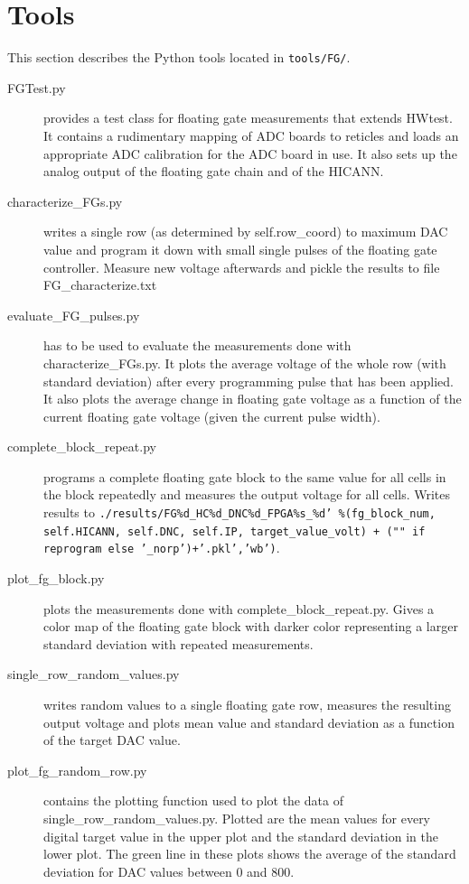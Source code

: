 \documentclass[a4paper,twocolumn,draft=true]{scrartcl}
\begin{document}
\section{Tools}
This section describes the Python tools located in \texttt{tools/FG/}.
\begin{description}
	\item[FGTest.py] provides a test class for floating gate measurements that extends HWtest.
		It contains a rudimentary mapping of ADC boards to reticles and loads an appropriate ADC calibration for the ADC board in use.
		It also sets up the analog output of the floating gate chain and of the HICANN.
	\item[characterize\_FGs.py] writes a single row (as determined by self.row\_coord) to maximum DAC value and program it down with small single pulses of the floating gate controller.
		Measure new voltage afterwards and pickle the results to file FG\_characterize.txt
	\item[evaluate\_FG\_pulses.py]
		has to be used to evaluate the measurements done with characterize\_FGs.py.
		It plots the average voltage of the whole row (with standard deviation) after every programming pulse that has been applied.
		It also plots the average change in floating gate voltage as a function of the current floating gate voltage (given the current pulse width).
	\item[complete\_block\_repeat.py] programs a complete floating gate block to the same value for all cells in the block repeatedly and measures the output voltage for all cells.
		Writes results to \sloppy\texttt{./results/FG\%d\_HC\%d\_DNC\%d\_FPGA\%s\_\%d' \%(fg\_block\_num, self.HICANN, self.DNC, self.IP, target\_value\_volt) + ("" if reprogram else '\_norp')+'.pkl','wb')}.
	\item[plot\_fg\_block.py] plots the measurements done with complete\_block\_repeat.py.
		Gives a color map of the floating gate block with darker color representing a larger standard deviation with repeated measurements.
	\item[single\_row\_random\_values.py] writes random values to a single floating gate row, measures the resulting output voltage and plots mean value and standard deviation as a function of the target DAC value.
	\item[plot\_fg\_random\_row.py] contains the plotting function used to plot the data of single\_row\_random\_values.py.
		Plotted are the mean values for every digital target value in the upper plot and the standard deviation in the lower plot.
		The green line in these plots shows the average of the standard deviation for DAC values between 0 and 800.
\end{description}

\end{document}
